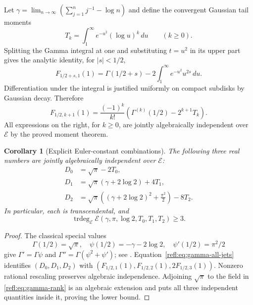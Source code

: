 \documentclass[11pt,a4paper]{article}
\newcommand{\E}{\mathcal E}
\DeclareMathOperator{\trdeg}{trdeg}
\newtheorem{corollary}[theorem]{Corollary}
\theoremstyle{definition}
\theoremstyle{remark}
\numberwithin{equation}{section}
\begin{document}
Let $\gamma=\lim_{n\to\infty}(\sum_{j=1}^n j^{-1}-\log n)$ and define
the convergent Gaussian tail moments
\begin{equation}\label{refl:eq:gaussian-tails}
 T_k=\int_1^\infty e^{-u^2}(\log u)^k\,du\qquad(k\geq0).
\end{equation}
Splitting the Gamma integral at one and substituting $t=u^2$ in its
upper part gives the analytic identity, for $|s|<1/2$,
\begin{equation}\label{refl:eq:gamma-tail-generating}
 F_{1/2+s,1}(1)
 =\Gamma(1/2+s)-2\int_1^\infty e^{-u^2}u^{2s}\,du.
\end{equation}
Differentiation under the integral is justified uniformly on compact
subdisks by Gaussian decay. Therefore
\begin{equation}\label{refl:eq:gamma-all-jets}
 F_{1/2,k+1}(1)
 =\frac{(-1)^k}{k!}
    \left(\Gamma^{(k)}(1/2)-2^{k+1}T_k\right).
\end{equation}
All expressions on the right, for $k\geq0$, are jointly algebraically
independent over $\E$ by the proved moment theorem.

\begin{corollary}[Explicit Euler-constant combinations]\label{refl:cor:gamma-three}
The following three real numbers are jointly algebraically independent
over $\E$:
\begin{align}
 D_0&=\sqrt\pi-2T_0,\label{refl:eq:gamma-d0}\\
 D_1&=\sqrt\pi(\gamma+2\log2)+4T_1,\label{refl:eq:gamma-d1}\\
 D_2&=\sqrt\pi\left((\gamma+2\log2)^2+\frac{\pi^2}{2}\right)-8T_2.
 \label{refl:eq:gamma-d2}
\end{align}
In particular, each is transcendental, and
\begin{equation}\label{refl:eq:gamma-rank}
 \trdeg_{\E}\E(\gamma,\pi,\log2,T_0,T_1,T_2)\geq3.
\end{equation}
\end{corollary}
\begin{proof}
The classical special values
\[
 \Gamma(1/2)=\sqrt\pi,\quad
 \psi(1/2)=-\gamma-2\log2,\quad
 \psi'(1/2)=\pi^2/2
\]
give $\Gamma'=\Gamma\psi$ and
$\Gamma''=\Gamma(\psi^2+\psi')$; see \cite[\S\S5.4,5.15]{DLMF}.
Equation~\eqref{refl:eq:gamma-all-jets} identifies $(D_0,D_1,D_2)$ with
$(F_{1/2,1}(1),F_{1/2,2}(1),2F_{1/2,3}(1))$.
Nonzero rational rescaling preserves algebraic independence.
Adjoining $\sqrt\pi$ to the field in \eqref{refl:eq:gamma-rank} is an
algebraic extension and puts all three independent quantities inside it,
proving the lower bound.
\end{proof}
\end{document}
